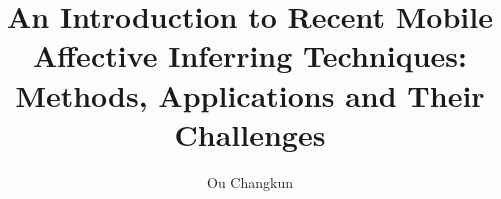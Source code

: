 \documentclass[journal]{vgtc}
\title{An Introduction to Recent Mobile Affective Inferring Techniques: \\Methods, Applications and Their Challenges}
\author{Ou Changkun}
\begin{document}
\maketitle







\nocite{*}
\printbibliography
\end{document}
